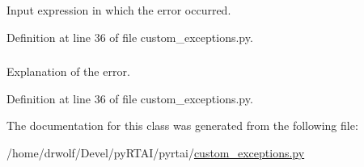 \-Input expression in which the error occurred. 



\-Definition at line 36 of file custom\-\_\-exceptions.\-py.

\hypertarget{classpyrtai_1_1custom__exceptions_1_1_rtai_xml_rpc_error_ae27d2ff28611a7af8703c3ee90e224a3}{
\subsubsection[{msg}]{}}
\label{classpyrtai_1_1custom__exceptions_1_1_rtai_xml_rpc_error_ae27d2ff28611a7af8703c3ee90e224a3}


\-Explanation of the error. 



\-Definition at line 36 of file custom\-\_\-exceptions.\-py.



\-The documentation for this class was generated from the following file\-:\begin{DoxyCompactItemize}
\item 
/home/drwolf/\-Devel/py\-R\-T\-A\-I/pyrtai/\hyperlink{custom__exceptions_8py}{custom\-\_\-exceptions.\-py}\end{DoxyCompactItemize}
